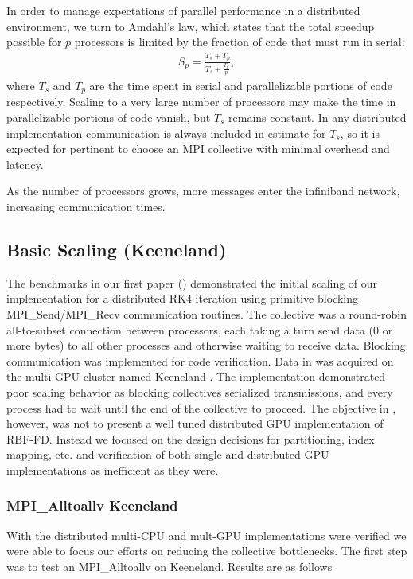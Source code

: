 \documentclass{report}
\begin{document}
In order to manage expectations of parallel performance in a distributed environment, we turn to Amdahl's law, which states that the total speedup possible for $p$ processors is limited by the fraction of code that must run in serial:
\begin{align}
S_p = \frac{T_s + T_p}{T_s + \frac{T_p}{p}},  \nonumber
\end{align}
where $T_s$ and $T_p$ are the time spent in serial and parallelizable portions of code respectively. Scaling to a very large number of processors may make the time in parallelizable portions of code vanish, but $T_s$ remains constant. In any distributed implementation communication is always included in estimate for $T_s$, so it is expected for  pertinent to choose an MPI collective with minimal overhead and latency. 

As the number of processors grows, more messages enter the infiniband network, increasing communication times. 



\subsection{Basic Scaling (Keeneland)}



The benchmarks in our first paper (\cite{BolligFlyerErlebacher2012}) demonstrated the initial scaling of our implementation for a distributed RK4 iteration using primitive blocking MPI\_Send/MPI\_Recv communication routines. The collective was a round-robin all-to-subset connection between processors, each taking a turn send data (0 or more bytes) to all other processes and otherwise waiting to receive data. Blocking communication was implemented for code verification. Data in \cite{BolligFlyerErlebacher2012} was acquired on the multi-GPU cluster named Keeneland \cite{Vetter2011}. The implementation demonstrated poor scaling behavior as blocking collectives serialized transmissions, and every process had to wait until the end of the collective to proceed. The objective in \cite{BolligFlyerErlebacher2012}, however, was not to present a well tuned distributed GPU implementation of RBF-FD. Instead we focused on the design decisions for partitioning, index mapping, etc. and verification of both single and distributed GPU implementations as inefficient as they were. 


\subsubsection{MPI\_Alltoallv Keeneland}
With the distributed multi-CPU and mult-GPU implementations were verified we were able to focus our efforts on reducing the collective bottlenecks. The first step was to test an MPI\_Alltoallv on Keeneland. Results are as follows
\end{document}
